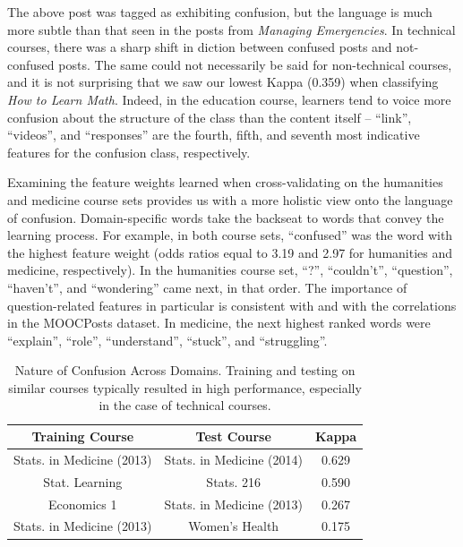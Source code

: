 \documentclass{edm_template}
\begin{document}
The above post was tagged as exhibiting confusion, but the language is much more subtle than that seen in the posts from \emph{Managing Emergencies}. In technical courses, there was a sharp shift in diction between confused posts and not-confused posts. The same could not necessarily be said for non-technical courses, and it is not surprising that we saw our lowest Kappa (0.359) when classifying \emph{How to Learn Math}. Indeed, in the education course, learners tend to voice more confusion about the structure of the class than the content itself -- ``link'', ``videos'', and ``responses'' are the fourth, fifth, and seventh most indicative features for the confusion class, respectively.

Examining the feature weights learned when cross-validating on the humanities and medicine course sets provides us with a more holistic view onto the language of confusion. Domain-specific words take the backseat to words that convey the learning process. For example, in both course sets, ``confused'' was the word with the highest feature weight (odds ratios equal to 3.19 and 2.97 for humanities and medicine, respectively). In the humanities course set, ``?'', ``couldn't'', ``question'', ``haven't'', and ``wondering'' came next, in that order. The importance of question-related features in particular is consistent with \cite{wilson1989learning} and with the correlations in the MOOCPosts dataset. In medicine, the next highest ranked words were ``explain'', ``role'', ``understand'', ``stuck'', and ``struggling''.

\begin{table}[ht!]
       \centering
       \begin{tabular}{|c|c|c|}
       \hline
       Training Course                & Test Course                    & Kappa \\ \hline
       Stats. in Medicine (2013)  & Stats. in Medicine (2014)  & 0.629 \\ \hline
       Stat. Learning           & Stats. 216                 & 0.590 \\ \hline
       Economics 1                    & Stats. in Medicine (2013)  & 0.267 \\ \hline
       Stats. in Medicine (2013)  & Women's Health                 & 0.175 \\ \hline
       \end{tabular}
       \caption{\textnormal{
       Nature of Confusion Across Domains. Training and testing on similar courses typically resulted in high performance, especially in the case of technical courses.
       }} 
       \label{table:across_courses} %
\end{table}
\end{document}
